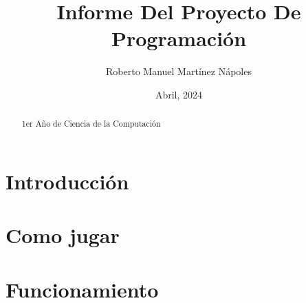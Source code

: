 \documentclass[spanish,10pt,a4paper]{article}
\begin{document}
	\title{Informe Del Proyecto De Programación}
	\author{Roberto Manuel Martínez Nápoles}
	\date{Abril, 2024}
	\maketitle
	\begin{abstract}
		\center 
		1er Año de Ciencia de la Computación  
	\end{abstract}
		
	\newpage
	
	
	\section{Introducción}\label{sec:Intro}
		
	
	
	\newpage
	\section{Como jugar}\label{sec:Como jugar}
	
           \section{Funcionamiento}\label{sec:Funcionamiento}
   
      
      
     
     \newpage
     \tableofcontents
     
        	
\end{document}
